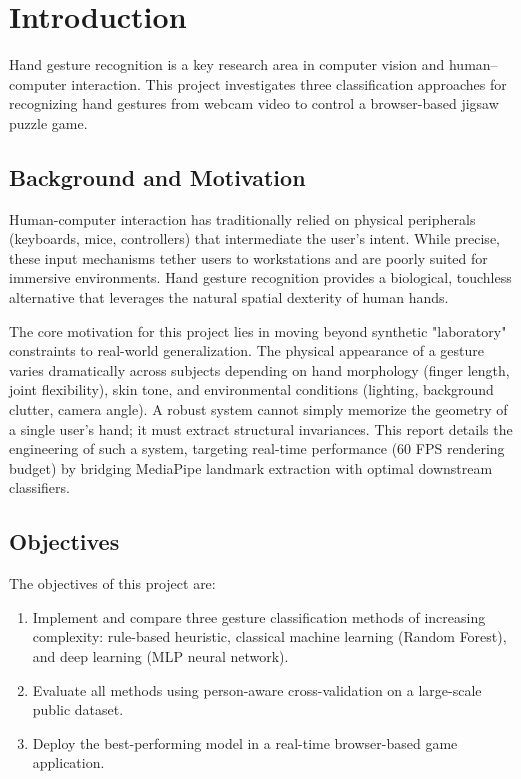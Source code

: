 \documentclass[11pt,a4paper]{article}
\begin{document}
\newpage
\tableofcontents
\newpage

\section{Introduction}
\label{sec:intro}

Hand gesture recognition is a key research area in computer vision and human--computer interaction. This project investigates three classification approaches for recognizing hand gestures from webcam video to control a browser-based jigsaw puzzle game.

\subsection{Background and Motivation}

Human-computer interaction has traditionally relied on physical peripherals (keyboards, mice, controllers) that intermediate the user's intent. While precise, these input mechanisms tether users to workstations and are poorly suited for immersive environments. Hand gesture recognition provides a biological, touchless alternative that leverages the natural spatial dexterity of human hands.

The core motivation for this project lies in moving beyond synthetic "laboratory" constraints to real-world generalization. The physical appearance of a gesture varies dramatically across subjects depending on hand morphology (finger length, joint flexibility), skin tone, and environmental conditions (lighting, background clutter, camera angle). A robust system cannot simply memorize the geometry of a single user's hand; it must extract structural invariances. This report details the engineering of such a system, targeting real-time performance (60 FPS rendering budget) by bridging MediaPipe landmark extraction with optimal downstream classifiers.

\subsection{Objectives}

The objectives of this project are:
\begin{enumerate}
    \item Implement and compare three gesture classification methods of increasing complexity: rule-based heuristic, classical machine learning (Random Forest), and deep learning (MLP neural network).
    \item Evaluate all methods using person-aware cross-validation on a large-scale public dataset.
    \item Deploy the best-performing model in a real-time browser-based game application.
\end{enumerate}
\end{document}
